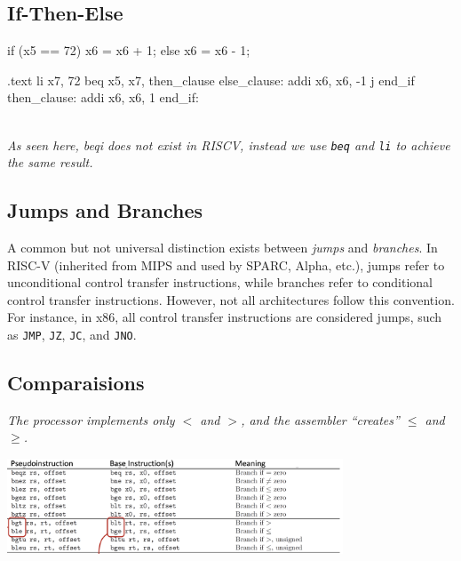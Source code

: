 \subsection{If-Then-Else}
\begin{minipage}[htp]{0.4\textwidth}
\begin{cc}
if (x5 == 72) {
    x6 = x6 + 1;
    } else {
    x6 = x6 - 1;
}
\end{cc}    
\end{minipage}
\hfill
\vline
\hfill
\begin{minipage}[htp]{0.4\textwidth}
\begin{assembly}
.text
    li x7, 72
    beq x5, x7, then_clause
else_clause:
    addi x6, x6, -1
    j end_if
then_clause:
    addi x6, x6, 1
end_if:
\end{assembly}
\end{minipage} \\
\vspace*{5px}
\textit{As seen here, beqi does not exist in RISCV, instead we use \texttt{beq} and \texttt{li} to achieve the same result.}
\subsection{Jumps and Branches}
A common but not universal distinction exists between \emph{jumps} and \emph{branches}. In RISC-V (inherited from MIPS and used by SPARC, Alpha, etc.), jumps refer to unconditional control transfer instructions, while branches refer to conditional control transfer instructions. However, not all architectures follow this convention. For instance, in x86, all control transfer instructions are considered jumps, such as \texttt{JMP}, \texttt{JZ}, \texttt{JC}, and \texttt{JNO}.

\subsection{Comparaisions}
\textit{The processor implements only $<$ and $>$, and the assembler “creates” $\leq$ and $\geq$.}

\begin{center}
    \includegraphics[width=0.75\textwidth]{chapters/chapter1b/images/comp.png}
\end{center}
